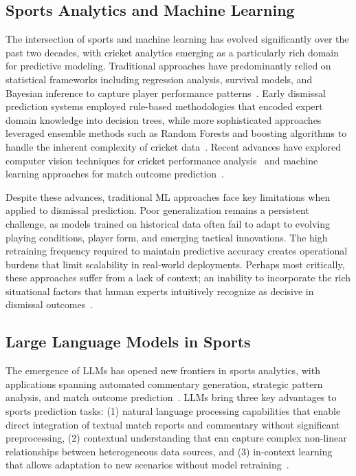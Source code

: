 \documentclass[sigconf,anonymous,review]{acmart}
\begin{document}
\subsection{Sports Analytics and Machine Learning}
The intersection of sports and machine learning has evolved significantly over the past two decades, with cricket analytics emerging as a particularly rich domain for predictive modeling. Traditional approaches have predominantly relied on statistical frameworks including regression analysis, survival models, and Bayesian inference to capture player performance patterns~\cite{cricket_analytics_survey}. Early dismissal prediction systems employed rule-based methodologies that encoded expert domain knowledge into decision trees, while more sophisticated approaches leveraged ensemble methods such as Random Forests and boosting algorithms to handle the inherent complexity of cricket data~\cite{cricket_dismissal_traditional}. Recent advances have explored computer vision techniques for cricket performance analysis~\cite{cricket_pose_estimation,cricket_backlift_recognition} and machine learning approaches for match outcome prediction~\cite{t20_match_prediction}.

Despite these advances, traditional ML approaches face key limitations when applied to dismissal prediction. Poor generalization remains a persistent challenge, as models trained on historical data often fail to adapt to evolving playing conditions, player form, and emerging tactical innovations. The high retraining frequency required to maintain predictive accuracy creates operational burdens that limit scalability in real-world deployments. Perhaps most critically, these approaches suffer from a lack of context; an inability to incorporate the rich situational factors that human experts intuitively recognize as decisive in dismissal outcomes~\cite{sports_data_mining}.


\subsection{Large Language Models in Sports}
The emergence of LLMs has opened new frontiers in sports analytics, with applications spanning automated commentary generation, strategic pattern analysis, and match outcome prediction~\cite{llm_sports_prediction}. LLMs bring three key advantages to sports prediction tasks: (1) natural language processing capabilities that enable direct integration of textual match reports and commentary without significant preprocessing, (2) contextual understanding that can capture complex non-linear relationships between heterogeneous data sources, and (3) in-context learning that allows adaptation to new scenarios without model retraining~\cite{contextual_learning_survey}.
\end{document}
